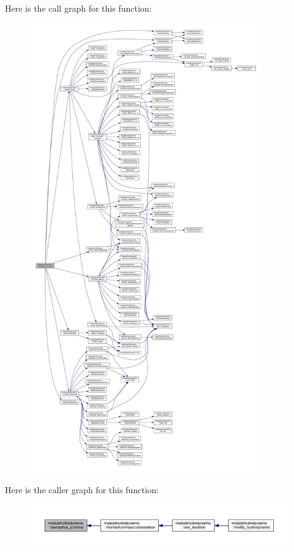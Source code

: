Here is the call graph for this function\+:\nopagebreak
\begin{figure}[H]
\begin{center}
\leavevmode
\includegraphics[height=550pt]{namespacemodulehydrodynamic_a8ca7371a9688becd96976013be92880a_cgraph}
\end{center}
\end{figure}
Here is the caller graph for this function\+:\nopagebreak
\begin{figure}[H]
\begin{center}
\leavevmode
\includegraphics[width=350pt]{namespacemodulehydrodynamic_a8ca7371a9688becd96976013be92880a_icgraph}
\end{center}
\end{figure}
\mbox{\label{namespacemodulehydrodynamic_a24a4da561094133e0ef8f2a5d350d8ac}} 
